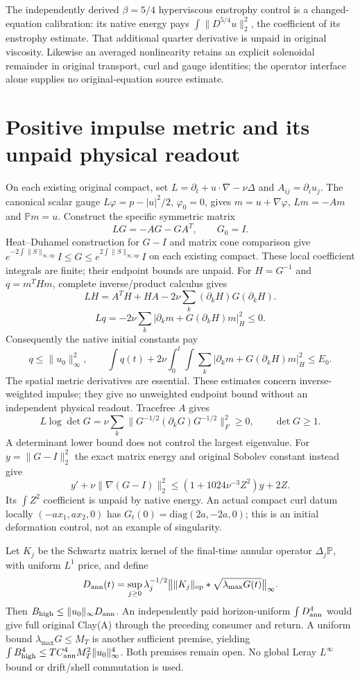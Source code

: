\documentclass[11pt]{article}
\begin{document}
The independently derived $\beta=5/4$ hyperviscous enstrophy control is
a changed-equation calibration: its native energy pays
$\int\|D^{5/4}u\|_2^2$, the coefficient of its enstrophy estimate.
That additional quarter derivative is unpaid in original viscosity.
Likewise an averaged nonlinearity retains an explicit solenoidal
remainder in original transport, curl and gauge identities; the operator
interface alone supplies no original-equation source estimate.

\section{Positive impulse metric and its unpaid physical readout}

On each existing original compact, set
$L=\partial_t+u\cdot\nabla-\nu\Delta$ and $A_{ij}=\partial_i u_j$.
The canonical scalar gauge $L\varphi=p-|u|^2/2$, $\varphi_0=0$,
gives $m=u+\nabla\varphi$, $Lm=-Am$ and $\mathbb Pm=u$.
Construct the specific symmetric matrix
\[
 LG=-AG-GA^T,\qquad G_0=I.
\]
Heat--Duhamel construction for $G-I$ and matrix cone comparison give
$e^{-2\int\|S\|_{\infty,\mathrm{op}}}I\le G
\le e^{2\int\|S\|_{\infty,\mathrm{op}}}I$ on each existing compact.
These local coefficient integrals are finite; their endpoint bounds are
unpaid. For $H=G^{-1}$ and $q=m^THm$, complete inverse/product calculus gives
\[
 LH=A^TH+HA-2\nu\sum_k(\partial_kH)G(\partial_kH).
\]
\[
 Lq=-2\nu\sum_k
 |\partial_km+G(\partial_kH)m|_H^2\le0.
\]
Consequently the native initial constants pay
\[
 q\le\|u_0\|_\infty^2,\qquad
 \int q(t)+2\nu\int_0^t\!\int\sum_k
 |\partial_km+G(\partial_kH)m|_H^2\le E_0.
\]
The spatial metric derivatives are essential. These estimates concern
inverse-weighted impulse; they give no unweighted endpoint bound without
an independent physical readout. Tracefree $A$ gives
\[
 L\log\det G=\nu\sum_k
 \|G^{-1/2}(\partial_kG)G^{-1/2}\|_F^2\ge0,
 \qquad\det G\ge1.
\]
A determinant lower bound does not control the largest eigenvalue.
For $y=\|G-I\|_2^2$ the exact matrix energy and original Sobolev constant
instead give
\[
 y'+\nu\|\nabla(G-I)\|_2^2
 \le(1+1024\nu^{-3}Z^2)y+2Z.
\]
Its $\int Z^2$ coefficient is unpaid by native energy. An actual compact
curl datum locally $(-ax_1,ax_2,0)$ has
$G_t(0)=\mathrm{diag}(2a,-2a,0)$; this is an initial deformation control,
not an example of singularity.

Let $K_j$ be the Schwartz matrix kernel of the final-time annular operator
$\Delta_j\mathbb P$, with uniform $L^1$ price, and define
\[
 D_{\rm ann}(t)=\sup_{j\ge0}\lambda_j^{-1/2}
 \big\|\|K_j\|_{\rm op}*\sqrt{\lambda_{\max}G(t)}\big\|_\infty.
\]
Then $B_{\rm high}\le\|u_0\|_\infty D_{\rm ann}$.
An independently paid horizon-uniform $\int D_{\rm ann}^4$ would give
full original Clay(A) through the preceding consumer and return.
A uniform bound $\lambda_{\max}G\le M_T$ is another sufficient premise,
yielding $\int B_{\rm high}^4\le
T C_{\rm ann}^4M_T^2\|u_0\|_\infty^4$. Both premises remain open.
No global Leray $L^\infty$ bound or drift/shell commutation is used.
\end{document}
